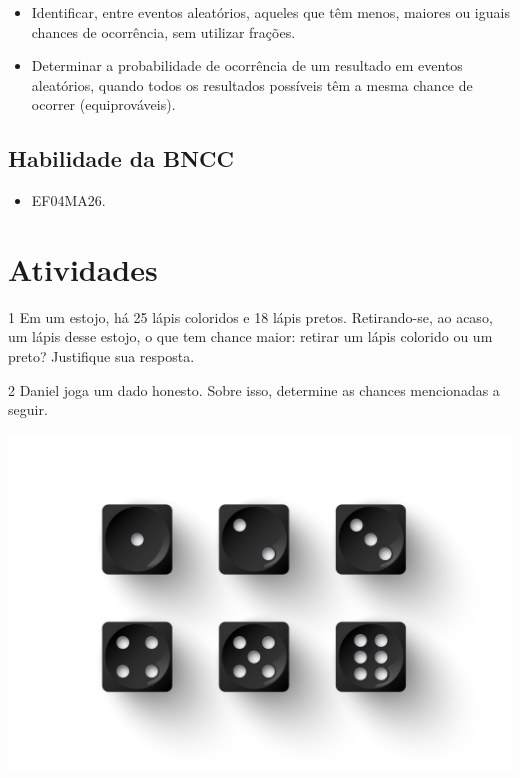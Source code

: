 \begin{itemize}
\item Identificar, entre eventos aleatórios, aqueles que têm menos, maiores ou
iguais chances de ocorrência, sem utilizar frações.

\item Determinar a probabilidade de ocorrência de um resultado em eventos
aleatórios, quando todos os resultados possíveis têm a mesma chance de
ocorrer (equiprováveis).
\end{itemize}

\subsection{Habilidade da BNCC}

\begin{itemize}
\item EF04MA26.
\end{itemize}


\section*{Atividades}

\num{1} Em um estojo, há 25 lápis coloridos e 18 lápis pretos. Retirando-se, ao
acaso, um lápis desse estojo, o que tem chance maior: retirar um lápis
colorido ou um preto? Justifique sua resposta.



\pagebreak
\num{2} Daniel joga um dado honesto. Sobre isso, determine as chances mencionadas a seguir.

\begin{center}
\includegraphics[width=.5\textwidth]{media/image37e.jpeg}
\end{center}


